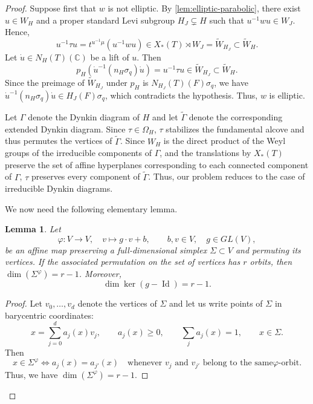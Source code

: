 \documentclass[11pt]{amsart}
\numberwithin{equation}{section}
\newtheorem{lemma}[lemma]{Lemma}
\theoremstyle{definition}
\theoremstyle{remark}
\begin{document}
\begin{proof}
Suppose first that $w$ is not elliptic.  By
\cref{lem:elliptic-parabolic}, there exist $u\in W_H$ and a proper standard
Levi subgroup $H_J\subsetneq H$ such that $u^{-1}wu\in W_J$. Hence,
\[
  u^{-1}\tau u
  =t^{u^{-1}\mu}(u^{-1}wu)
  \in X_*(T)\rtimes W_J=\widetilde W_{H_J}\subset\widetilde{W}_H.
\]
Let $\dot u\in N_H(T)(\mathbb C)$ be a lift of $u$. Then
\[
  p_{H}(\dot u^{-1}(n_H\sigma_q)\dot u)
  =u^{-1}\tau u\in\widetilde W_{H_J}\subset\widetilde{W}_H.
\]
Since the preimage of
$\widetilde W_{H_J}$ under $p_H$ is
$N_{H_J}(T)(F)\sigma_q$, we have $\dot u^{-1}(n_H\sigma_q)\dot u\in H_J(F)\sigma_q$, which contradicts the hypothesis. Thus, $w$ is
elliptic.

Let $\Gamma$ denote the Dynkin diagram of $H$ and let $\widetilde{\Gamma}$ denote the corresponding extended Dynkin diagram.
Since $\tau\in\Omega_H$, $\tau$ stabilizes the
fundamental alcove and thus permutes the vertices of $\widetilde{\Gamma}$. Since $W_H$ is the direct product of the
Weyl groups of the irreducible components of $\Gamma$, and the translations by $X_{*}(T)$ preserve the set of affine hyperplanes corresponding to each connected component of $\Gamma$, $\tau$ preserves every component of $\widetilde{\Gamma}$. Thus, our problem reduces to the case of irreducible Dynkin diagrams.

We now need the following elementary lemma.
\begin{lemma}\label{simplex}
Let 
\[
    \varphi:V\rightarrow V,
    \quad
    v\mapsto g\cdot v+b, \qquad b,v\in V,
    \quad g\in GL(V),
\]
be an affine map preserving a full-dimensional simplex $\Sigma\subset V$ and permuting its vertices.  If the associated permutation on the set of vertices has $r$ orbits, then $\dim(\Sigma^\varphi)=r-1$. Moreover,
\[
  \dim\ker(g-\operatorname{Id})=r-1.
\]
\end{lemma}
\begin{proof}
Let $v_0,\ldots,v_d$ denote the vertices of $\Sigma$ and let us write points of $\Sigma$ in barycentric coordinates:
\[
  x=\sum_{j=0}^{d}a_j(x)v_j,
  \qquad a_j(x)\geq0,
  \qquad \sum_ja_j(x)=1,
  \qquad 
  x\in\Sigma.
\]
Then 
\[
x\in\Sigma^\varphi
\iff
a_j(x)=a_{j'}(x)
\quad\text{whenever $v_j$ and $v_{j'}$ belong to the same
$\varphi$-orbit.}
\]
Thus, we have
$\dim(\Sigma^\varphi)=r-1$.


\end{proof}
\end{proof}
\end{document}
